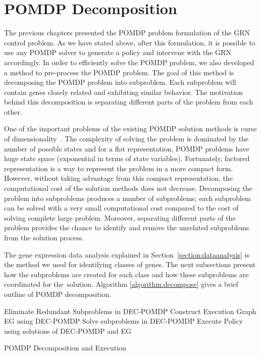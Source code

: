 \chapter{POMDP Decomposition}
\label{chapter:decomposition}

 The previous chapters presented the POMDP problem formulation of the GRN control
problem. As we have stated above, after this formulation, it is possible to use any POMDP solver to generate
a policy and intervene with the GRN accordingly. In order to efficiently solve the POMDP problem, we also
developed a method to pre-process the POMDP problem. The goal of this method is decomposing the POMDP problem
into subproblem. Each subproblem will contain genes closely related and exhibiting similar behavior. The
motivation behind this decomposition is separating different parts of the problem from each other.

One of the important problems of the existing POMDP solution methods is curse of
dimensionality~\cite{Bellman61}. The complexity of solving the problem is dominated by the number of possible
states and for a flat representation, POMDP problems have huge state space (exponential in terms of state
variables). Fortunately, factored representation is a way to represent the problem in a more compact form.
However, without taking advantage from this compact representation, the computational cost of the solution
methods does not decrease. Decomposing the problem into subproblems produces a number of subproblems; each
subproblem can be solved with a very small computational cost compared to the cost of solving complete large
problem. Moreover, separating different parts of the problem provides the chance to identify and remove the
unrelated subproblems from the solution process.

The gene expression data analysis explained in Section~\ref{section:dataanalysis} is the method we used for
identifying classes of genes. The next subsections present how the subproblems are created for each class and
how these subproblems are coordinated for the~solution.  Algorithm \ref{algorithm:decompose} gives a brief outline
of POMDP decomposition.

{\small
\begin{algorithm}
\dontprintsemicolon
{}
Eliminate Redundant Subproblems in DEC-POMDP\;
Construct Execution Graph EG using DEC-POMDP\;
Solve subproblems in DEC-POMDP\;
Execute Policy using solutions of DEC-POMDP and EG
\caption{POMDP Decomposition and Execution}~\label{algorithm:decompose}
\end{algorithm}
}

